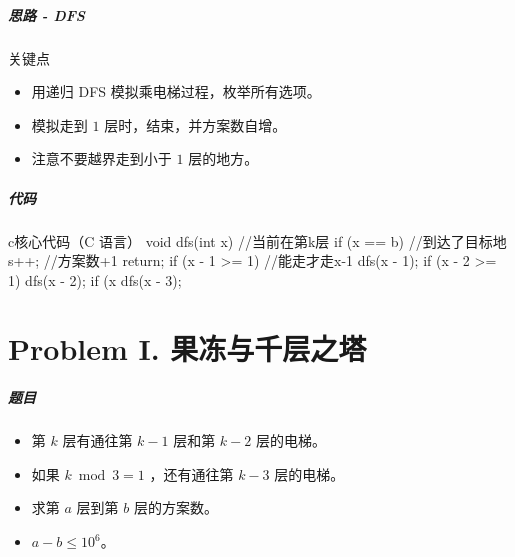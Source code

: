 \documentclass[
     aspectratio=169,                   %
]{beamer}
\begin{document}
\begin{frame}
	\frametitle{思路 - DFS}
	 \begin{exampleblock}{关键点}
		 \begin{itemize}
			\item 用递归 DFS 模拟乘电梯过程，枚举所有选项。
			\item 模拟走到 $1$ 层时，结束，并方案数自增。
		\end{itemize}
	\end{exampleblock}
	\begin{itemize}
		\item 注意不要越界走到小于 $1$ 层的地方。
	\end{itemize}
	
\end{frame}

\begin{frame}[fragile]
	\frametitle{代码}
	 \begin{codeblock}{c}{核心代码（C 语言）}
void dfs(int x) //当前在第k层
{
    if (x == b) //到达了目标地
    {
        s++; //方案数+1
        return;
    }
    if (x - 1 >= 1) //能走才走x-1
        dfs(x - 1);
    if (x - 2 >= 1)
        dfs(x - 2);
    if (x %
        dfs(x - 3);
}
\end{codeblock}
\end{frame}


\part{Problem I. 果冻与千层之塔}
\begin{frame}
	\frametitle{题目}
	\begin{itemize}
		\item 第 $k$ 层有通往第 $k-1$ 层和第 $k-2$ 层的电梯。
		\item 如果 $k \bmod 3 = 1$ ，还有通往第 $k-3$ 层的电梯。
		\item 求第 $a$ 层到第 $b$ 层的方案数。
		\item $a-b\le10^6$。
	\end{itemize}
\end{frame}
\end{document}
